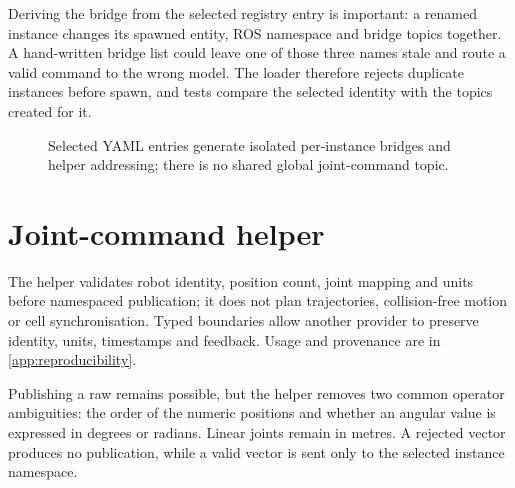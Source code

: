Deriving the bridge from the selected registry entry is important: a renamed
instance changes its spawned entity, ROS namespace and bridge topics together.
A hand-written bridge list could leave one of those three names stale and route
a valid command to the wrong model. The loader therefore rejects duplicate
instances before spawn, and tests compare the selected identity with the topics
created for it.

\begin{figure}[htbp]
\centering
\resizebox{0.98\textwidth}{!}{}
\caption[Configuration-driven multi-robot command and feedback isolation.]
{Selected YAML entries generate isolated per-instance bridges and helper
addressing; there is no shared global joint-command topic.}
\label{fig:robot-flow}
\end{figure}

\section{Joint-command helper}

The helper validates robot identity, position count, joint mapping and units
before namespaced publication; it does not plan trajectories, collision-free
motion or cell synchronisation. Typed boundaries allow another provider to
preserve identity, units, timestamps and feedback. Usage and provenance are in
\cref{app:reproducibility}.

Publishing a raw  remains possible, but the helper removes
two common operator ambiguities: the order of the numeric positions and whether
an angular value is expressed in degrees or radians. Linear joints remain in
metres. A rejected vector produces no publication, while a valid vector is sent
only to the selected instance namespace.

